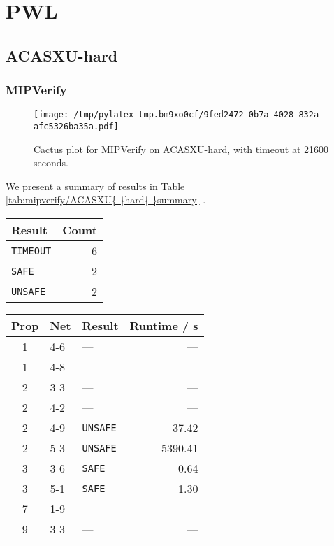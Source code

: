 \documentclass{article}%
\begin{document}
%
\normalsize%
\section{PWL}%
\label{sec:PWL}%
\subsection{ACASXU{-}hard}%
\label{subsec:ACASXU{-}hard}%
\subsubsection{MIPVerify}%
\label{ssubsec:MIPVerify}%


\begin{figure}[htb]%
\centering%
\texttt{[image: /tmp/pylatex-tmp.bm9xo0cf/9fed2472-0b7a-4028-832a-afc5326ba35a.pdf]}%
\caption{Cactus plot for MIPVerify on ACASXU{-}hard, with timeout at 21600 seconds.}%
\end{figure}

%
We present a summary of results in Table %
\ref{tab:mipverify/ACASXU{-}hard{-}summary}%
.%


\begin{table}[!h]%
\caption{Summary of results for MIPVerify on ACASXU{-}hard. Timeouts were set at 21600 secs.}%
\label{tab:mipverify/ACASXU{-}hard{-}summary}%
\begin{longtable}{@{}l|r@{}}%
\toprule%
\textbf{Result}&\textbf{Count}\\%
\midrule%
\verb|TIMEOUT|&6\\%
\verb|SAFE|&2\\%
\verb|UNSAFE|&2\\\bottomrule%
%
\end{longtable}%
\end{table}

%
\begin{longtable}{@{}cll|r@{}}%
\toprule%
\textbf{Prop}&\textbf{Net}&\textbf{Result}&\textbf{Runtime / s}\\%
\midrule%
\endhead%
1&4{-}6&—&—\\%
1&4{-}8&—&—\\%
2&3{-}3&—&—\\%
2&4{-}2&—&—\\%
2&4{-}9&\verb|UNSAFE|&37.42\\%
2&5{-}3&\verb|UNSAFE|&5390.41\\%
3&3{-}6&\verb|SAFE|&0.64\\%
3&5{-}1&\verb|SAFE|&1.30\\%
7&1{-}9&—&—\\%
9&3{-}3&—&—\\\bottomrule%
%
\end{longtable}

%
\end{document}
